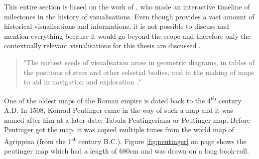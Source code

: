 This entire section is based on the work of \citeauthor{Friendly.2001}, who made an interactive timeline of milestones in the history of visualisations. Even though \citeauthor{Friendly.2001} provides a vast amount of historical visualisations and informations, it is not possible to discuss and mention everything because it would go beyond the scope and therefore only the contextually relevant visualisations for this thesis are discussed .

\begin{quote}
    "The earliest seeds of visualisation arose in geometric diagrams, in tables of the positions of stars and other celestial bodies, and in the making of maps to aid in navigation and exploration ."
\end{quote}

One of the oldest maps of the Roman empire is dated back to the 4\textsuperscript{th} century A.D. In 1508, Konrad Peutinger came in the way of such a map and it was named after him at a later date: Tabula Peutingeriana or Peutinger map. Before Peutinger got the map, it was copied multiple times from the world map of Agrippina (from the 1\textsuperscript{st} century B.C.). Figure \ref{fig:peutinger} on page \pageref{fig:peutinger} shows the peutinger map which had a length of 680cm and was drawn on a long book-roll.

